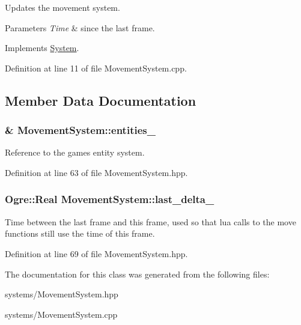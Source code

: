 Updates the movement system. 


\begin{DoxyParams}{Parameters}
{\em Time} & since the last frame. \\
\hline
\end{DoxyParams}


Implements \hyperlink{class_system_a6d54c9bd38eb43d620a1451cb0925472}{System}.



Definition at line 11 of file Movement\+System.\+cpp.



\subsection{Member Data Documentation}
\subsubsection[{\texorpdfstring{entities\+\_\+}{entities_}}]{\& Movement\+System\+::entities\+\_\+\hspace{0.3cm}{\ttfamily [private]}}\hypertarget{class_movement_system_a373d446bb2c853079f63437629d6044b}{}\label{class_movement_system_a373d446bb2c853079f63437629d6044b}


Reference to the game\textquotesingle{}s entity system. 



Definition at line 63 of file Movement\+System.\+hpp.

\subsubsection[{\texorpdfstring{last\+\_\+delta\+\_\+}{last_delta_}}]{\setlength{\rightskip}{0pt plus 5cm}Ogre\+::\+Real Movement\+System\+::last\+\_\+delta\+\_\+\hspace{0.3cm}{\ttfamily [private]}}\hypertarget{class_movement_system_aca59e8025a42f269c245d0ecbcab396c}{}\label{class_movement_system_aca59e8025a42f269c245d0ecbcab396c}


Time between the last frame and this frame, used so that lua calls to the move functions still use the time of this frame. 



Definition at line 69 of file Movement\+System.\+hpp.



The documentation for this class was generated from the following files\+:\begin{DoxyCompactItemize}
\item 
systems/Movement\+System.\+hpp\item 
systems/Movement\+System.\+cpp\end{DoxyCompactItemize}
